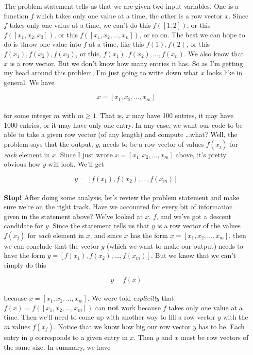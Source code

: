 \documentclass{article}
\begin{document}
The problem statement tells us that we are given two input variables. One is a function $f$ which takes only one value at a time, the other is a row vector $x$. Since $f$ takes only one value at a time, we can't do this $f([1, 2])$, or this $f([x_1, x_2, x_3])$, or this $f([x_1, x_2, \dots, x_n])$, or so on. The best we can hope to do is throw one value into $f$ at a time, like this $f(1), f(2)$, or this $f(x_1), f(x_2), f(x_3)$, or this, $f(x_1), f(x_2), \dots, f(x_n)$. We also know that $x$ is a row vector. But we don't know how many entries it has. So as I'm getting my head around this problem, I'm just going to write down what $x$ looks like in general. We have

\[
x = [x_1, x_2, \dots, x_m]
\] \\

{\setlength{\parindent}{0cm}
for some integer $m$ with $m \geq 1$. That is, $x$ may have 100 entries, it may have 1000 entries, or it may have only one entry. In any case, we want our code to be able to take a given row vector (of any length) and compute \dots what? Well, the problem says that the output, $y$, needs to be a row vector of values $f(x_j)$ for \textit{each} element in $x$. Since I just wrote $x = [x_1, x_2, \dots, x_m]$ above, it's pretty obvious how $y$ will look. We'll get}

\[
y = [ f(x_1), f(x_2), \dots, f(x_m)]
\] \\

{\setlength{\parindent}{0cm}
\textbf{Stop!} After doing some analysis, let's review the problem statement and make sure we're on the right track. Have we accounted for every bit of information given in the statement above? We've looked at $x$, $f$, and we've got a descent candidate for $y$. Since the statement tells us that $y$ is a row vector of the values $f(x_j)$ for \textit{each} element in $x$, and since $x$ has the form $x = [x_1, x_2, \dots, x_m]$, then we can conclude that the vector $y$ (which we want to make our output) needs to have the form $y = [ f(x_1), f(x_2), \dots, f(x_m)]$. But we know that we can't simply do this}

\[
y = f(x)
\] \\

{\setlength{\parindent}{0cm}
because $x = [ x_1, x_2, \dots, x_m]$. We were told \textit{explicitly} that $f(x) = f([x_1, x_2, \dots, x_m])$ can \textbf{not} work because $f$ takes only one value at a time. Then we'll need to come up with another way to fill a row vector $y$ with the $m$ values $f(x_j)$. Notice that we know how big our row vector $y$ has to be. Each entry in $y$ corresponds to a given entry in $x$. Then $y$ and $x$ must be row vectors of the same size. In summary, we have}
\end{document}
